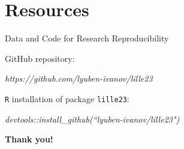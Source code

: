 \documentclass{beamer}
\begin{document}
\section{Resources}

\begin{frame}{Data and Code for Research Reproducibility}

GitHub repository: 

\quad \quad \textit{https://github.com/lyuben-ivanov/lille23}

\vfill

\texttt{R} installation of package \texttt{lille23}:

\quad \quad \textit{devtools::install\_github(``lyuben-ivanov/lille23")}

\end{frame}



\begin{frame}
\centering \Huge \bfseries Thank you!	
\end{frame}
\end{document}
